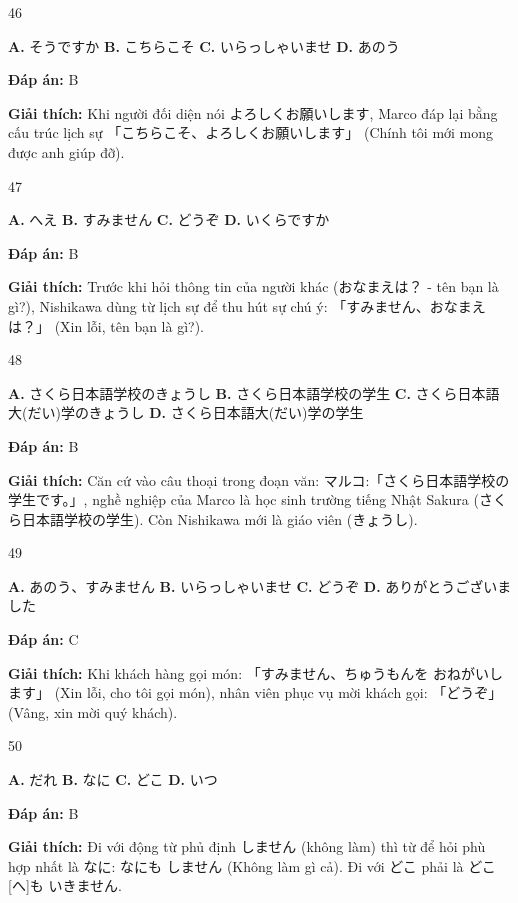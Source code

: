 \documentclass[12pt,a4paper]{report}
\newcommand{\source}[1]{}
\newcommand{\choice}[2]{\textbf{#1.} #2 \quad}
\newcommand{\answer}[1]{\par\textbf{Đáp án:} #1}
\newcommand{\confidence}[1]{}
\newcommand{\explain}[1]{\par\textbf{Giải thích:} #1\vspace{0.5cm}}
\begin{document}
\begin{question}{46}
\source{Q28.webp}
\choice{A}{そうですか}
\choice{B}{こちらこそ}
\choice{C}{いらっしゃいませ}
\choice{D}{あのう}
\answer{B}
\confidence{high}
\explain{Khi người đối diện nói よろしくお願いします, Marco đáp lại bằng cấu trúc lịch sự 「こちらこそ、よろしくお願いします」 (Chính tôi mới mong được anh giúp đỡ).}
\end{question}

\begin{question}{47}
\source{Q29.webp}
\choice{A}{へえ}
\choice{B}{すみません}
\choice{C}{どうぞ}
\choice{D}{いくらですか}
\answer{B}
\confidence{high}
\explain{Trước khi hỏi thông tin của người khác (おなまえは？ - tên bạn là gì?), Nishikawa dùng từ lịch sự để thu hút sự chú ý: 「すみません、おなまえは？」 (Xin lỗi, tên bạn là gì?).}
\end{question}

\begin{question}{48}
\source{Q30.webp}
\choice{A}{さくら日本語学校のきょうし}
\choice{B}{さくら日本語学校の学生}
\choice{C}{さくら日本語大(だい)学のきょうし}
\choice{D}{さくら日本語大(だい)学の学生}
\answer{B}
\confidence{high}
\explain{Căn cứ vào câu thoại trong đoạn văn: マルコ:「さくら日本語学校の学生です。」, nghề nghiệp của Marco là học sinh trường tiếng Nhật Sakura (さくら日本語学校の学生). Còn Nishikawa mới là giáo viên (きょうし).}
\end{question}

\begin{question}{49}
\source{Q16.webp}
\choice{A}{あのう、すみません}
\choice{B}{いらっしゃいませ}
\choice{C}{どうぞ}
\choice{D}{ありがとうございました}
\answer{C}
\confidence{high}
\explain{Khi khách hàng gọi món: 「すみません、ちゅうもんを おねがいします」 (Xin lỗi, cho tôi gọi món), nhân viên phục vụ mời khách gọi: 「どうぞ」 (Vâng, xin mời quý khách).}
\end{question}

\begin{question}{50}
\source{Q17.webp}
\choice{A}{だれ}
\choice{B}{なに}
\choice{C}{どこ}
\choice{D}{いつ}
\answer{B}
\confidence{high}
\explain{Đi với động từ phủ định しません (không làm) thì từ để hỏi phù hợp nhất là なに: なにも しません (Không làm gì cả). Đi với どこ phải là どこ[へ]も いきません.}
\end{question}
\end{document}
